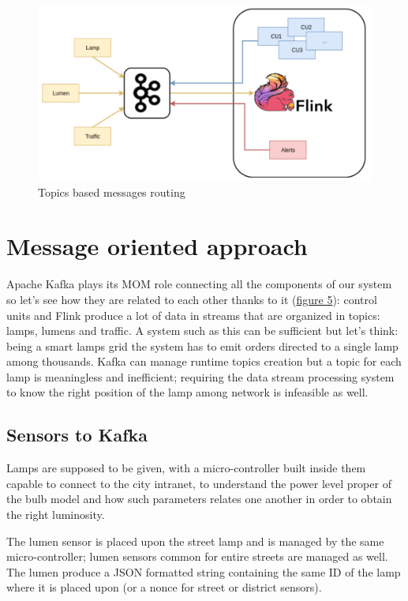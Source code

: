 \begin{figure}[!b]
\begin{center}
	\includegraphics[scale=0.50]{img/ember_kafkatopology}
	\caption{Topics based messages routing}
	\label{fig:ember_kafkatopology}
\end{center}
\end{figure}

\section{Message oriented approach}
Apache Kafka plays its MOM role connecting all the components of our system so let’s see how they are related to each other thanks to it (\hyperref[fig:ember_kafkatopology]{figure 5}): control units and Flink produce a lot of data in streams that are organized in topics: lamps, lumens and traffic. A system such as this can be sufficient but let’s think: being a smart lamps grid the system has to emit orders directed to a single lamp among thousands. Kafka can manage runtime topics creation but a topic for each lamp is meaningless and inefficient; requiring the data stream processing system to know the right position of the lamp among network is infeasible as well.

\subsection{Sensors to Kafka}
Lamps are supposed to be given, with a micro-controller built inside them capable to connect to the city intranet, to understand the power level proper of the bulb model and how such parameters relates one another in order to obtain the right luminosity.

The lumen sensor is placed upon the street lamp and is managed by the same micro-controller; lumen sensors common for entire streets are managed as well. The lumen produce a JSON formatted string containing the same ID of the lamp where it is placed upon (or a nonce for street or district sensors).

